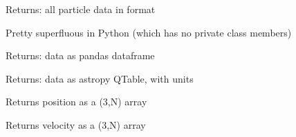 \documentclass[letterpaper,10pt,english]{sphinxmanual}
\begin{document}
\begin{fulllineitems}
\begin{fulllineitems}
\begin{description}
\end{description}

\end{fulllineitems}


\begin{fulllineitems}
\label{\detokenize{galaxy:galaxy.galaxy.Galaxy.get_array}}
Returns: all particle data in  format

Pretty superfluous in Python (which has no private class members)

\end{fulllineitems}


\begin{fulllineitems}
\label{\detokenize{galaxy:galaxy.galaxy.Galaxy.get_df}}
Returns: data as pandas dataframe

\end{fulllineitems}


\begin{fulllineitems}
\label{\detokenize{galaxy:galaxy.galaxy.Galaxy.get_qtable}}
Returns: data as astropy QTable, with units

\end{fulllineitems}


\begin{fulllineitems}
\label{\detokenize{galaxy:galaxy.galaxy.Galaxy.xyz}}
Returns position as a (3,N) array

\end{fulllineitems}


\begin{fulllineitems}
\label{\detokenize{galaxy:galaxy.galaxy.Galaxy.vxyz}}
Returns velocity as a (3,N) array


\end{fulllineitems}
\end{fulllineitems}
\end{document}
